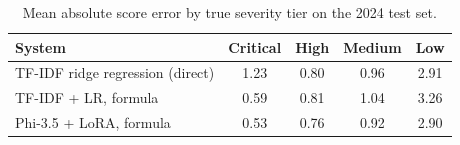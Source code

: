 \begin{table}[t]
\centering
\caption{Mean absolute score error by true severity tier on the 2024 test set.}
\label{tab:tiermae}
\small
\begin{tabular}{lcccc}
\toprule
System & Critical & High & Medium & Low \\
\midrule
TF-IDF ridge regression (direct) & 1.23 & 0.80 & 0.96 & 2.91 \\
TF-IDF + LR, formula & 0.59 & 0.81 & 1.04 & 3.26 \\
Phi-3.5 + LoRA, formula & 0.53 & 0.76 & 0.92 & 2.90 \\
\bottomrule
\end{tabular}
\end{table}
